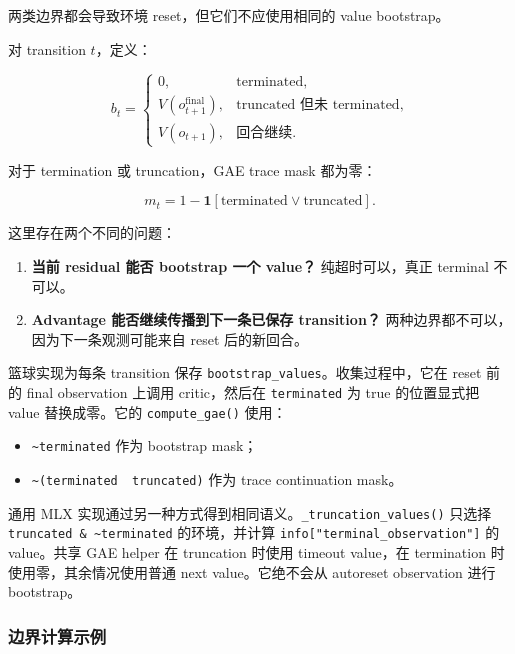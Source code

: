 \documentclass[
  chinese,
  11pt,
  letterpaper,
]{article}
\providecommand{\tightlist}{%
  \setlength{\itemsep}{0pt}\setlength{\parskip}{0pt}}
\begin{document}
两类边界都会导致环境 reset，但它们不应使用相同的 value bootstrap。

对 transition \(t\)，定义：

\[
b_t=
\begin{cases}
0,&\text{terminated},\\
V(o_{t+1}^{\mathrm{final}}),&\text{truncated 但未 terminated},\\
V(o_{t+1}),&\text{回合继续}.
\end{cases}
\]

对于 termination 或 truncation，GAE trace mask 都为零：

\[
m_t=1-\mathbf 1[\text{terminated}\lor\text{truncated}].
\]

这里存在两个不同的问题：

\begin{enumerate}
\def\labelenumi{\arabic{enumi}.}
\tightlist
\item
  \textbf{当前 residual 能否 bootstrap 一个 value？} 纯超时可以，真正
  terminal 不可以。
\item
  \textbf{Advantage 能否继续传播到下一条已保存 transition？}
  两种边界都不可以，因为下一条观测可能来自 reset 后的新回合。
\end{enumerate}

篮球实现为每条 transition 保存
\texttt{bootstra\allowbreak{}p\_\allowbreak{}values}。收集过程中，它在
reset 前的 final observation 上调用 critic，然后在 \texttt{terminated}
为 true 的位置显式把 value 替换成零。它的 \texttt{compute\_gae()} 使用：

\begin{itemize}
\tightlist
\item
  \texttt{\textasciitilde{}terminated} 作为 bootstrap mask；
\item
  \texttt{\textasciitilde{}(terminated\ \textbar{}\ truncated)} 作为
  trace continuation mask。
\end{itemize}

通用 MLX 实现通过另一种方式得到相同语义。\texttt{\_truncation\_values()}
只选择 \texttt{truncated\ \&\ \textasciitilde{}terminated}
的环境，并计算 \texttt{info{[}"terminal\_observation"{]}} 的 value。共享
GAE helper 在 truncation 时使用 timeout value，在 termination
时使用零，其余情况使用普通 next value。它绝不会从 autoreset observation
进行 bootstrap。

\subsubsection{边界计算示例}\label{ux8fb9ux754cux8ba1ux7b97ux793aux4f8b}
\end{document}

